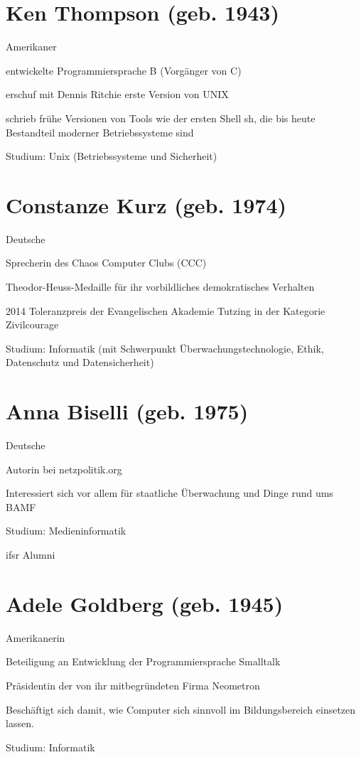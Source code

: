 \documentclass[a4paper,12pt]{report}
\begin{document}
\section*{Ken Thompson (geb. 1943)}
\begin{itemize*}
    \item Amerikaner
    \item entwickelte Programmiersprache B (Vorgänger von C)
    \item erschuf mit Dennis Ritchie erste Version von UNIX
    \item schrieb frühe Versionen von Tools wie der ersten Shell sh, die bis heute Bestandteil
          moderner Betriebssysteme sind
    \item Studium: Unix (Betriebssysteme und Sicherheit)
\end{itemize*}

\section*{Constanze Kurz (geb. 1974)}
\begin{itemize*}
    \item Deutsche 
    \item Sprecherin des Chaos Computer Clubs (CCC)
    \item Theodor-Heuss-Medaille für ihr vorbildliches demokratisches Verhalten
    \item 2014 Toleranzpreis der Evangelischen Akademie Tutzing in der Kategorie Zivilcourage
    \item Studium: Informatik (mit Schwerpunkt Überwachungstechnologie, Ethik, Datenschutz und Datensicherheit)
\end{itemize*}

\section*{Anna Biselli (geb. 1975)}
\begin{itemize*}
    \item Deutsche
    \item Autorin bei netzpolitik.org
    \item Interessiert sich vor allem für staatliche Überwachung und Dinge rund ums BAMF
    \item Studium: Medieninformatik
    \item ifsr Alumni
\end{itemize*}

\section*{Adele Goldberg (geb. 1945)}
\begin{itemize*}
    \item Amerikanerin
    \item Beteiligung an Entwicklung der Programmiersprache Smalltalk
    \item Präsidentin der von ihr mitbegründeten Firma Neometron
    \item Beschäftigt sich damit, wie Computer sich sinnvoll im Bildungsbereich einsetzen lassen.
    \item Studium: Informatik
\end{itemize*}
\end{document}
